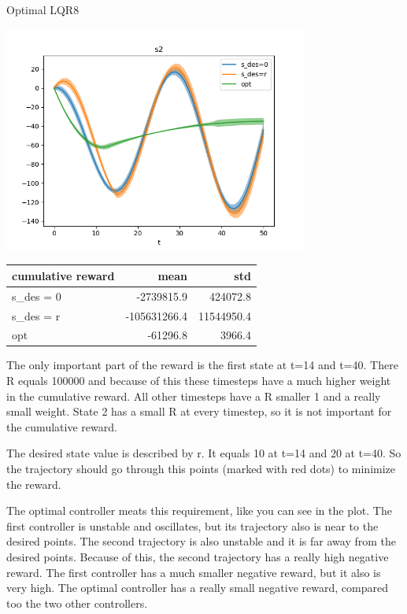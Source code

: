 \begin{questions}
\begin{question}{Optimal LQR}{8}
\begin{answer}
	\begin{center}
		\includegraphics[width=0.75\textwidth]{img/1c_3.png}
	\end{center}

	\begin{center}
		\begin{tabular}{|l|r|r|}
			\hline 
			cumulative reward & mean & std \\ 
			\hline 
			s\_des = 0 & -2739815.9 & 424072.8 \\ 
			\hline 
			s\_des = r & -105631266.4 & 11544950.4 \\ 
			\hline 
			opt & -61296.8 & 3966.4 \\ 
			\hline 
		\end{tabular}
	\end{center}	

	The only important part of the reward is the first state at t=14 and t=40. There R equals 100000 and because of this these timesteps have a much higher weight in the cumulative reward. All other timesteps have a R smaller 1 and a really small weight. State 2 has a small R at every timestep, so it is not important for the cumulative reward. 
	
	The desired state value is described by r. It equals 10 at t=14 and 20 at t=40. So the trajectory should go through this points (marked with red dots) to minimize the reward.

	The optimal controller meats this requirement, like you can see in the plot. The first controller is unstable and oscillates, but its trajectory also is near to the desired points. The second trajectory is also unstable and it is far away from the desired points. Because of this, the second trajectory has a really high negative reward. The first controller has a much smaller negative reward, but it also is very high. The optimal controller has a really small negative reward, compared too the two other controllers.
	
\end{answer}
\end{question}


\end{questions}

